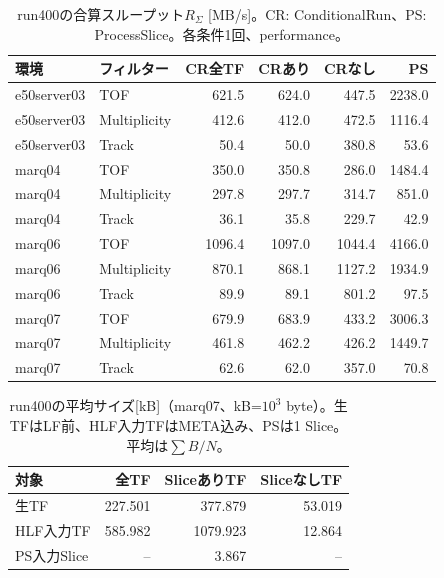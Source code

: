 \begin{table}[H]\centering\small
\caption{run400の合算スループット$R_\Sigma$ [MB/s]。CR: ConditionalRun、PS: ProcessSlice。各条件1回、performance。}
\begin{tabular}{llrrrr}\hline
環境 & フィルター & CR全TF & CRあり & CRなし & PS \\\hline
e50server03 & TOF & 621.5 & 624.0 & 447.5 & 2238.0 \\
e50server03 & Multiplicity & 412.6 & 412.0 & 472.5 & 1116.4 \\
e50server03 & Track & 50.4 & 50.0 & 380.8 & 53.6 \\
marq04 & TOF & 350.0 & 350.8 & 286.0 & 1484.4 \\
marq04 & Multiplicity & 297.8 & 297.7 & 314.7 & 851.0 \\
marq04 & Track & 36.1 & 35.8 & 229.7 & 42.9 \\
marq06 & TOF & 1096.4 & 1097.0 & 1044.4 & 4166.0 \\
marq06 & Multiplicity & 870.1 & 868.1 & 1127.2 & 1934.9 \\
marq06 & Track & 89.9 & 89.1 & 801.2 & 97.5 \\
marq07 & TOF & 679.9 & 683.9 & 433.2 & 3006.3 \\
marq07 & Multiplicity & 461.8 & 462.2 & 426.2 & 1449.7 \\
marq07 & Track & 62.6 & 62.0 & 357.0 & 70.8 \\
\hline\end{tabular}\end{table}
\begin{table}[H]\centering\small
\caption{run400の平均サイズ[kB]（marq07、kB=$10^3$ byte）。生TFはLF前、HLF入力TFはMETA込み、PSは1 Slice。平均は$\sum B/N$。}
\begin{tabular}{lrrr}\hline 対象 & 全TF & SliceありTF & SliceなしTF \\\hline
生TF & 227.501 & 377.879 & 53.019 \\
HLF入力TF & 585.982 & 1079.923 & 12.864 \\
PS入力Slice & -- & 3.867 & -- \\
\hline\end{tabular}\end{table}
